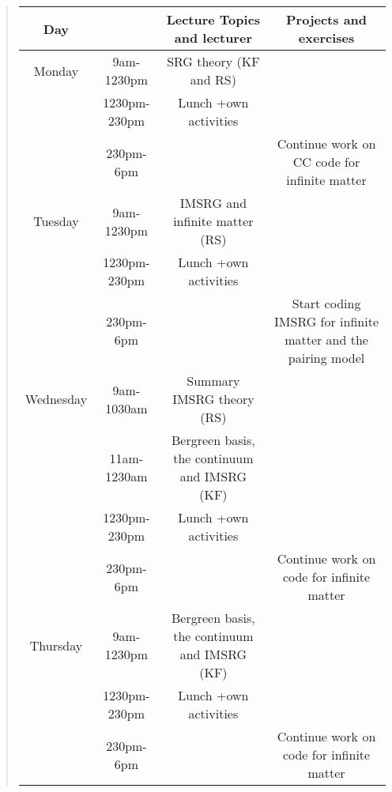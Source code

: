 \documentclass[%
oneside,                 %
final,                   %
10pt]{article}
\begin{document}
\begin{quote}
\begin{tabular}{cccc}
\hline
\multicolumn{1}{c}{ Day } & \multicolumn{1}{c}{  } & \multicolumn{1}{c}{ Lecture Topics and lecturer } & \multicolumn{1}{c}{ Projects and exercises } \\
\hline
Monday    & 9am-1230pm   & SRG theory (KF and RS)                               &                                                              \\
          & 1230pm-230pm & Lunch +own activities                                &                                                              \\
          & 230pm-6pm    &                                                      & Continue work on CC code for infinite matter                 \\
\hline
Tuesday   & 9am-1230pm   & IMSRG and infinite matter (RS)                       &                                                              \\
          & 1230pm-230pm & Lunch +own activities                                &                                                              \\
          & 230pm-6pm    &                                                      & Start coding IMSRG for infinite matter and the pairing model \\
\hline
Wednesday & 9am-1030am   & Summary IMSRG theory (RS)                            &                                                              \\
          & 11am-1230am  & Bergreen basis, the continuum and IMSRG (KF)         &                                                              \\
          & 1230pm-230pm & Lunch +own activities                                &                                                              \\
          & 230pm-6pm    &                                                      & Continue work on code for infinite matter                    \\
\hline
Thursday  & 9am-1230pm   & Bergreen basis, the continuum and IMSRG (KF)         &                                                              \\
          & 1230pm-230pm & Lunch +own activities                                &                                                              \\
          & 230pm-6pm    &                                                      & Continue work on code for infinite matter                    \\

\end{tabular}
\end{quote}
\end{document}
